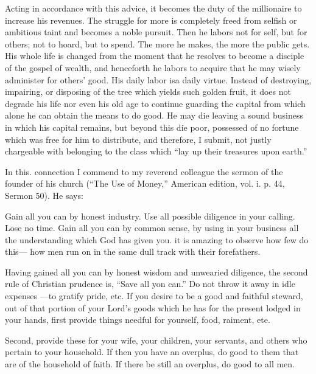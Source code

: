 \documentclass[11pt,openany]{book}
\begin{document}
Acting in accordance with this advice, it becomes the duty of the millionaire to increase his revenues. The struggle for more is completely freed from selfish or ambitious taint and becomes a noble pursuit. Then he labors not for self, but for others; not to hoard, but to spend. The more he makes, the more the public gets. His whole life is changed from the moment that he resolves to become a disciple of the gospel of wealth, and henceforth he labors to acquire that he may wisely administer for others' good. His daily labor isa daily virtue. Instead of destroying, impairing, or disposing of the tree which yields such golden fruit, it does not degrade his life nor even his old age to continue guarding the capital from which alone he can obtain the means to do good. He may die leaving a sound business in which his capital remains, but beyond this die poor, possessed of no fortune which was free for him to distribute, and therefore, I submit, not justly chargeable with belonging to the class which ``lay up their treasures upon earth.''

In this. connection I commend to my reverend colleague the sermon of the founder of his church (``The Use of Money,'' American edition, vol. i. p. 44, Sermon 50). He says:

Gain all you can by honest industry. Use all possible diligence in your calling. Lose no time. Gain all you can by common sense, by using in your business all the understanding which God has given you. it is amazing to observe how few do this--- how men run on in the same dull track with their forefathers.

Having gained all you can by honest wisdom and unwearied diligence, the second rule of Christian prudence is, ``Save all yon can.'' Do not throw it away in idle expenses ---to gratify pride, etc. If you desire to be a good and faithful steward, out of that portion of your Lord's goods which he has for the present lodged in your hands, first provide things needful for yourself, food, raiment, ete.

Second, provide these for your wife, your children, your servants, and others who pertain to your household. If then you have an overplus, do good to them that are of the household of faith. If there be still an overplus, do good to all men.
\end{document}
